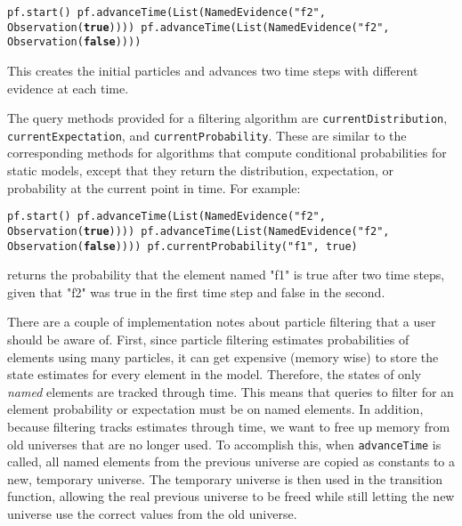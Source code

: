 \begin{flushleft}
\texttt{pf.start()
\newline pf.advanceTime(List(NamedEvidence("f2", Observation(\textbf{true}))))
\newline pf.advanceTime(List(NamedEvidence("f2", Observation(\textbf{false}))))}
\end{flushleft}

This creates the initial particles and advances two time steps with different evidence at each time. 

The query methods provided for a filtering algorithm are \texttt{currentDi\-stribution},
\texttt{currentExpectation}, and \texttt{currentProbability}. These are similar to the corresponding methods for algorithms that compute conditional probabilities for static models, except that they return the distribution, expectation, or probability at the current point in time. For example:

\begin{flushleft}
\texttt{pf.start()
\newline pf.advanceTime(List(NamedEvidence("f2", Observation(\textbf{true}))))
\newline pf.advanceTime(List(NamedEvidence("f2", Observation(\textbf{false}))))
\newline pf.currentProbability("f1", true)}
\end{flushleft}

returns the probability that the element named "f1" is true after two time steps, given that "f2" was true in the first time step and false in the second.

There are a couple of implementation notes about particle filtering that a user should be aware of. First, since particle filtering estimates probabilities of elements using many particles, it can get expensive (memory wise) to store the state estimates for every element in the model. Therefore, the states of only \emph{named} elements are tracked through time. This means that queries to filter for an element probability or expectation must be on named elements. In addition, because filtering tracks estimates through time, we want to free up memory from old universes that are no longer used. To accomplish this, when \texttt{advanceTime} is called, all named elements from the previous universe are copied as constants to a new, temporary universe. The temporary universe is then used in the transition function, allowing the real previous universe to be freed while still letting the new universe use the correct values from the old universe.

